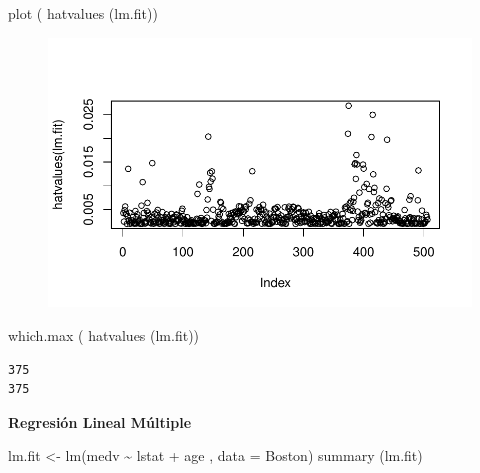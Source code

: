 \documentclass[
  letterpaper,
  DIV=11,
  numbers=noendperiod]{scrartcl}
\newenvironment{Shaded}{\begin{snugshade}}{\end{snugshade}}
\newcommand{\AttributeTok}[1]{\textcolor[rgb]{0.40,0.45,0.13}{#1}}
\newcommand{\FunctionTok}[1]{\textcolor[rgb]{0.28,0.35,0.67}{#1}}
\newcommand{\NormalTok}[1]{\textcolor[rgb]{0.00,0.23,0.31}{#1}}
\newcommand{\OtherTok}[1]{\textcolor[rgb]{0.00,0.23,0.31}{#1}}
\newcommand{\SpecialCharTok}[1]{\textcolor[rgb]{0.37,0.37,0.37}{#1}}
\begin{document}
\begin{Shaded}
\begin{Highlighting}[]
\FunctionTok{plot}\NormalTok{ ( }\FunctionTok{hatvalues}\NormalTok{ (lm.fit))}
\end{Highlighting}
\end{Shaded}

\begin{figure}[H]

{\centering \includegraphics{Regresion-lineal-simple-y-multiple_files/figure-pdf/unnamed-chunk-15-1.pdf}

}

\end{figure}

\begin{Shaded}
\begin{Highlighting}[]
\FunctionTok{which.max}\NormalTok{ ( }\FunctionTok{hatvalues}\NormalTok{ (lm.fit))}
\end{Highlighting}
\end{Shaded}

\begin{verbatim}
375 
375 
\end{verbatim}

\textbf{Regresión Lineal Múltiple}

\begin{Shaded}
\begin{Highlighting}[]
\NormalTok{lm.fit }\OtherTok{\textless{}{-}} \FunctionTok{lm}\NormalTok{(medv }\SpecialCharTok{\textasciitilde{}}\NormalTok{ lstat }\SpecialCharTok{+}\NormalTok{ age , }\AttributeTok{data =}\NormalTok{ Boston)}
\FunctionTok{summary}\NormalTok{ (lm.fit)}
\end{Highlighting}
\end{Shaded}
\end{document}
